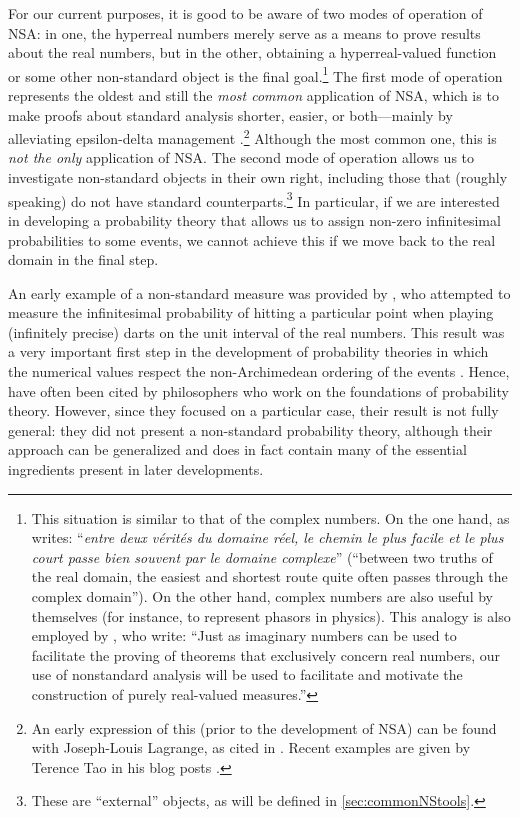 For our current purposes, it is good to be aware of two modes of operation of NSA: in one, the hyperreal numbers merely serve as a means to prove results about the real numbers, but in the other, obtaining a hyperreal-valued function or some other non-standard object is the final goal.\footnote{This situation is similar to that of the complex numbers. On the one hand, as \citet[pp.~1--2]{Painleve:1967} writes: ``\textit{entre deux v{\'{e}}rit{\'{e}}s du domaine r{\'{e}}el, le chemin le plus facile et le plus court passe bien souvent par le domaine complexe}'' (``between two truths of the real domain, the easiest and shortest route quite often passes through the complex domain''). On the other hand, complex numbers are also useful by themselves (for instance, to represent phasors in physics).
This analogy is also employed by \citet[p.~416]{BarthaHitchcock:1999}, who write: ``Just as imaginary numbers can be used to facilitate the proving of theorems that exclusively concern real numbers, our use of nonstandard analysis will be used to facilitate and motivate the construction of purely real-valued measures.''}
The first mode of operation represents the oldest and still the \emph{most common} application of NSA, which is to make proofs about standard analysis shorter, easier, or both---mainly by alleviating epsilon-delta management \citep{Tao:2007}.\footnote{An early expression of this (prior to the development of NSA) can be found with Joseph-Louis Lagrange, as cited in \citet[p.~63]{Blaszczyk_etal:2013}. Recent examples are given by Terence Tao in his blog posts \citep[see, \textit{e.g.},][]{Tao:2007-2012}.} Although the most common one, this is \emph{not the only} application of NSA.
The second mode of operation allows us to investigate non-standard objects in their own right, including those that (roughly speaking) do not have standard counterparts.\footnote{These are ``external'' objects, as will be defined in \autoref{sec:commonNStools}.} In particular, if we are interested in developing a probability theory that allows us to assign non-zero infinitesimal probabilities to some events, we cannot achieve this if we move back to the real domain in the final step.

An early example of a non-standard measure was provided by \citet{BernsteinWattenberg:1969}, who attempted to measure the infinitesimal probability of hitting a particular point when playing (infinitely precise) darts on the unit interval of the real numbers. This result was a very important first step in the development of probability theories in which the numerical values respect the non-Archimedean ordering of the events \citep[as studied by~][]{deFinetti:1936}. Hence, \citet{BernsteinWattenberg:1969} have often been cited by philosophers who work on the foundations of probability theory. However, since they focused on a particular case, their result is not fully general: they did not present a non-standard probability theory, although their approach can be generalized and does in fact contain many of the essential ingredients present in later developments.

